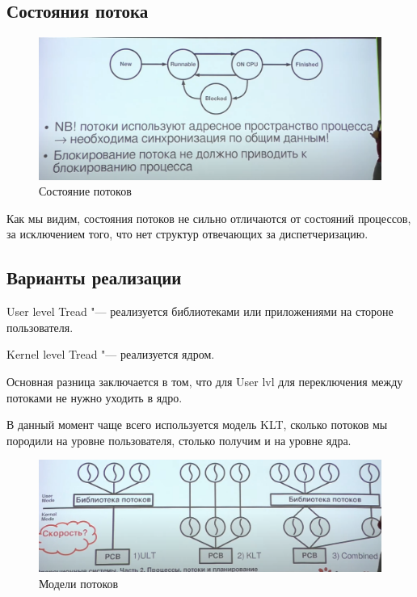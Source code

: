 \documentclass[bachelor, och, book]{SCWorks}
\theoremstyle{remark}
\begin{document}
    \subsection{Состояния потока}

    \begin{figure}[H]
        \begin{center}
            \includegraphics[scale=0.40]{res/state-of-tread.png}
            \caption{Состояние потоков}
        \end{center}
    \end{figure}

    Как мы видим, состояния потоков не сильно отличаются от состояний процессов, за исключением того, что нет структур отвечающих за диспетчеризацию.

    \subsection{Варианты реализации}

    User level Tread "--- реализуется библиотеками или приложениями на стороне пользователя.

    Kernel level Tread "--- реализуется ядром. 

    Основная разница заключается в том, что для User lvl для переключения между потоками не нужно уходить в ядро.

    В данный момент чаще всего используется модель KLT, сколько потоков мы породили на уровне пользователя, столько получим и на уровне ядра.

    \begin{figure}[H]
        \begin{center}
            \includegraphics[scale=0.40]{res/models-of-tread.png}
            \caption{Модели потоков}
        \end{center}
    \end{figure}
\end{document}
